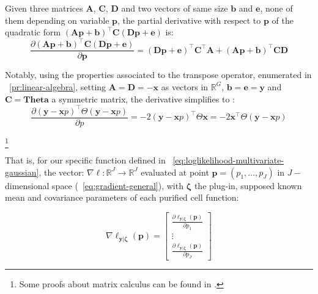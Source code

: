 \documentclass[long, final]{jobim}
\newcommand \RR {\mathbb{R}}
\begin{document}
\begin{property}
Given three matrices $\boldsymbol{A}$, $\boldsymbol{C}$, $\boldsymbol{D}$ and two vectors of same size $\boldsymbol{b}$ and $\boldsymbol{e}$, none of them depending on variable $\boldsymbol{p}$, the partial derivative with respect to $\boldsymbol{p}$ of the quadratic form $(\boldsymbol{A} \boldsymbol{p} + \boldsymbol{b})^\top \boldsymbol{C} (\boldsymbol{D} \boldsymbol{p} + \boldsymbol{e})$ is:
\begin{equation*}
    \frac{\partial (\boldsymbol{A} \boldsymbol{p} + \boldsymbol{b})^\top \boldsymbol{C} (\boldsymbol{D} \boldsymbol{p} + \boldsymbol{e})}{\partial \boldsymbol{p}} = (\boldsymbol{D} \boldsymbol{p} + \boldsymbol{e})^\top \boldsymbol{C}^\top \boldsymbol{A} + (\boldsymbol{A} \boldsymbol{p} + \boldsymbol{b})^\top \boldsymbol{C} \boldsymbol{D}
\end{equation*}

Notably, using the properties associated to the transpose operator, enumerated in \propertyname~\ref{pr:linear-algebra}, setting $\boldsymbol{A} = \boldsymbol{D} = - \boldsymbol{x}$ as vectors in $\RR^G$,  $\boldsymbol{b} = \boldsymbol{e} = \boldsymbol{y}$ and $\boldsymbol{C}= \boldsymbol{Theta}$ a symmetric matrix, the derivative simplifies to :
\begin{equation*}
    \frac{\partial (\boldsymbol{y} - \boldsymbol{x} p)^\top \Theta (\boldsymbol{y} - \boldsymbol{x} p)}{\partial p} = -2  (\boldsymbol{y} - \boldsymbol{x} p)^\top \Theta \boldsymbol{x} = -2 \boldsymbol{x}^\top \Theta (\boldsymbol{y} - \boldsymbol{x} p)
\end{equation*}

\footnote{Some proofs about matrix calculus can be found in \cite{kaare12}.}
\end{property}


That is, for our specific function defined in \equationname~\ref{eq:loglikelihood-multivariate-gaussian}, the vector: $\nabla \ell: \RR^J \to \RR^J$ evaluated at point $\boldsymbol{p}=(p_1, \ldots, p_J)$ in $J-$dimensional space (\equationname~\ref{eq:gradient-general}), with $\boldsymbol{\zeta}$ the plug-in, supposed known mean and covariance parameters of each purified cell function:

\begin{equation}
\label{eq:gradient-general}
\nabla\ell_{\boldsymbol{y} | \boldsymbol{\zeta}} (\boldsymbol{p})=
\begin{bmatrix}
\frac{\partial \ell_{\boldsymbol{y} | \boldsymbol{\zeta}} (\boldsymbol{p})}{\partial p_1} \\
\vdots \\
\frac{\partial \ell_{\boldsymbol{y} | \boldsymbol{\zeta}}(\boldsymbol{p})}{\partial p_J}
\end{bmatrix}
\end{equation}
\end{document}
